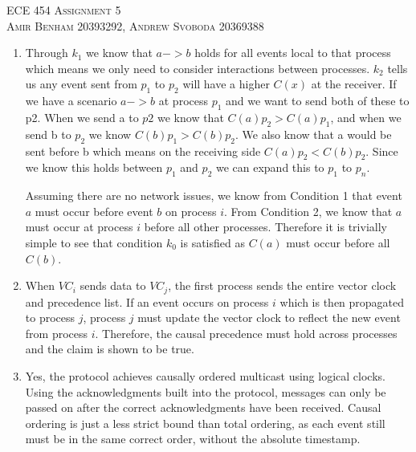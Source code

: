 \documentclass{article}
\begin{document}
\begin{center}
\textsc{\Large ECE 454 Assignment 5}\\[0.5cm]
\textsc{Amir Benham 20393292, Andrew Svoboda 20369388}\\[0.5cm]
\end{center}

\begin{enumerate}

	\item  

Through \(k_1\) we know that  \(a -> b\) holds for all events local to that process which means we only need to consider interactions between processes. \(k_2\) tells us any event sent from \(p_1\) to \(p_2\) will have a higher \(C(x)\) at the receiver. If we have a scenario \(a -> b\) at process \(p_1\) and we want to send both of these to p2. When we send a to \(p2\) we know that \(C(a) p_2 > C(a) p_1\), and when we send b to \(p_2\) we know \(C(b) p_1 > C(b) p_2\).  We also know that a would be sent before b which means on the receiving side \(C(a) p_2 < C(b) p_2\). Since we know this holds between \(p_1\) and \(p_2\) we can expand this to \(p_1\) to \(p_n\).

Assuming there are no network issues, we know from Condition 1 that event \(a\) must occur before event \(b\) on process \(i\). From Condition 2, we know that \(a\) must occur at process \(i\) before all other processes. Therefore it is trivially simple to see that condition \(k_0\) is satisfied as \(C(a)\) must occur before all \(C(b)\).

	\item

When \(VC_i\) sends data to \(VC_j\), the first process sends the entire vector clock and precedence list. If an event occurs on process \(i\) which is then propagated to process \(j\), process \(j\) must update the vector clock to reflect the new event from process \(i\). Therefore, the causal precedence must hold across processes and the claim is shown to be true. 

	\item

Yes, the protocol achieves causally ordered multicast using logical clocks. Using the acknowledgments built into the protocol, messages can only be passed on after the correct acknowledgments have been received. Causal ordering is just a less strict bound than total ordering, as each event still must be in the same correct order, without the absolute timestamp.


\end{enumerate}
\end{document}
